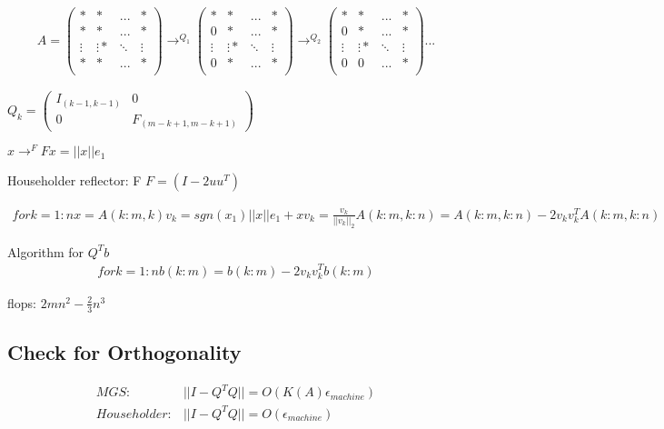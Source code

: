 \documentclass{article}
\begin{document}
\begin{align*}
  A = \begin{pmatrix}
        * & * & ... & *\\
        * & * & ... & *\\
        \vdots & \vdots* & \ddots & \vdots \\
        * & * & ... & *\\
      \end{pmatrix}
      \rightarrow^{Q_1}
      \begin{pmatrix}
        * & * & ... & *\\
        0 & * & ... & *\\
        \vdots & \vdots* & \ddots & \vdots \\
        0 & * & ... & *\\
      \end{pmatrix}
      \rightarrow^{Q_2}
      \begin{pmatrix}
        * & * & ... & *\\
        0 & * & ... & *\\
        \vdots & \vdots* & \ddots & \vdots \\
        0 & 0 & ... & *\\
      \end{pmatrix}
      ...
\end{align*}

$Q_k = \begin{pmatrix} I_{(k-1, k-1)} & 0 \\ 0 & F_{(m-k+1, m-k+1)} \end{pmatrix}$

$x \rightarrow^F Fx = ||x||e_1$

Householder reflector: F
$F = (I - 2uu^T)$

\begin{align*}
  for k = 1:n
    x = A(k:m, k)
    v_k = sgn(x_1)||x||e_1 + x
    v_k=\frac{v_k}{||v_k||_2}
    A(k:m, k:n) = A(k:m, k:n) - 2v_kv_k^TA(k:m, k:n)
\end{align*}

Algorithm for $Q^Tb$
\begin{align*}
  for k = 1:n
    b(k:m) = b(k:m) - 2v_kv_k^Tb(k:m)
\end{align*}

flops: $2mn^2 - \frac{2}{3}n^3$

\subsection{Check for Orthogonality}
\label{sec:qr:test}

\begin{align*}
  MGS:         &||I - Q^TQ|| = O(K(A)\epsilon_{machine})\\
  Householder: &||I - Q^TQ|| = O(\epsilon_{machine})\\
\end{align*}
\end{document}
